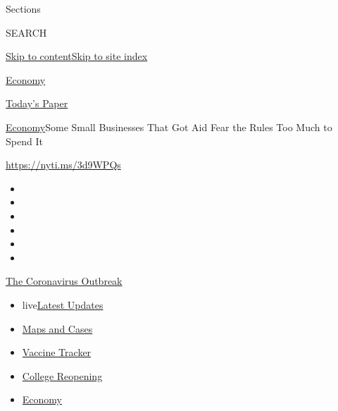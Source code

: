 Sections

SEARCH

\protect\hyperlink{site-content}{Skip to
content}\protect\hyperlink{site-index}{Skip to site index}

\href{https://www.nytimes3xbfgragh.onion/section/business/economy}{Economy}

\href{https://myaccount.nytimes3xbfgragh.onion/auth/login?response_type=cookie\&client_id=vi}{}

\href{https://www.nytimes3xbfgragh.onion/section/todayspaper}{Today's
Paper}

\href{/section/business/economy}{Economy}\textbar{}Some Small Businesses
That Got Aid Fear the Rules Too Much to Spend It

\url{https://nyti.ms/3d9WPQs}

\begin{itemize}
\item
\item
\item
\item
\item
\item
\end{itemize}

\href{https://www.nytimes3xbfgragh.onion/news-event/coronavirus?action=click\&pgtype=Article\&state=default\&region=TOP_BANNER\&context=storylines_menu}{The
Coronavirus Outbreak}

\begin{itemize}
\tightlist
\item
  live\href{https://www.nytimes3xbfgragh.onion/2020/08/04/world/coronavirus-cases.html?action=click\&pgtype=Article\&state=default\&region=TOP_BANNER\&context=storylines_menu}{Latest
  Updates}
\item
  \href{https://www.nytimes3xbfgragh.onion/interactive/2020/us/coronavirus-us-cases.html?action=click\&pgtype=Article\&state=default\&region=TOP_BANNER\&context=storylines_menu}{Maps
  and Cases}
\item
  \href{https://www.nytimes3xbfgragh.onion/interactive/2020/science/coronavirus-vaccine-tracker.html?action=click\&pgtype=Article\&state=default\&region=TOP_BANNER\&context=storylines_menu}{Vaccine
  Tracker}
\item
  \href{https://www.nytimes3xbfgragh.onion/2020/08/02/us/covid-college-reopening.html?action=click\&pgtype=Article\&state=default\&region=TOP_BANNER\&context=storylines_menu}{College
  Reopening}
\item
  \href{https://www.nytimes3xbfgragh.onion/live/2020/08/04/business/stock-market-today-coronavirus?action=click\&pgtype=Article\&state=default\&region=TOP_BANNER\&context=storylines_menu}{Economy}
\end{itemize}

